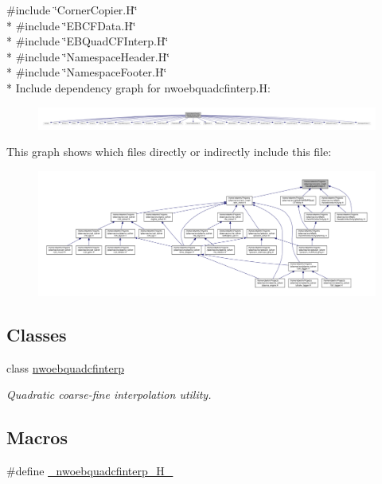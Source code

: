 {\ttfamily \#include \char`\"{}Corner\+Copier.\+H\char`\"{}}\\*
{\ttfamily \#include \char`\"{}E\+B\+C\+F\+Data.\+H\char`\"{}}\\*
{\ttfamily \#include \char`\"{}E\+B\+Quad\+C\+F\+Interp.\+H\char`\"{}}\\*
{\ttfamily \#include \char`\"{}Namespace\+Header.\+H\char`\"{}}\\*
{\ttfamily \#include \char`\"{}Namespace\+Footer.\+H\char`\"{}}\\*
Include dependency graph for nwoebquadcfinterp.\+H\+:\nopagebreak
\begin{figure}[H]
\begin{center}
\leavevmode
\includegraphics[width=350pt]{nwoebquadcfinterp_8H__incl}
\end{center}
\end{figure}
This graph shows which files directly or indirectly include this file\+:\nopagebreak
\begin{figure}[H]
\begin{center}
\leavevmode
\includegraphics[width=350pt]{nwoebquadcfinterp_8H__dep__incl}
\end{center}
\end{figure}
\subsection*{Classes}
\begin{DoxyCompactItemize}
\item 
class \hyperlink{classnwoebquadcfinterp}{nwoebquadcfinterp}
\begin{DoxyCompactList}\small\item\em Quadratic coarse-\/fine interpolation utility. \end{DoxyCompactList}\end{DoxyCompactItemize}
\subsection*{Macros}
\begin{DoxyCompactItemize}
\item 
\#define \hyperlink{nwoebquadcfinterp_8H_a32123da7c11c3e63c4a0504ef9f0b0e0}{\+\_\+nwoebquadcfinterp\+\_\+\+H\+\_\+}
\end{DoxyCompactItemize}


